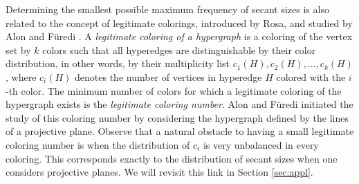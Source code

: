 \documentclass[10pt]{article}
\theoremstyle{definition}
\newcommand{\zs}[1]{\textcolor{magenta}{\textbf{#1}}}
\begin{document}
	Determining the smallest possible maximum frequency of secant sizes  is also related to the concept of legitimate colorings, introduced by Rosa, and studied by  Alon and Füredi \cite{Alon-Furedi}. A\textit{ legitimate coloring of a hypergraph} is a coloring of the vertex set by $k$ colors such that all hyperedges are distinguishable by their color distribution, in other words, by their multiplicity list $c_1(H), c_2(H), \ldots, c_k(H)$, where $c_i(H)$ denotes the number of vertices in hyperedge $H$ colored with the $i$-th color. The minimum number of colors for which a legitimate coloring of the hypergraph exists is the \textit{legitimate coloring number}. Alon and Füredi initiated the study of this coloring number by considering the hypergraph defined by the lines of a projective plane.  {Observe that a natural obstacle to having a small legitimate coloring number is when the distribution of $c_i$ is very unbalanced in every coloring. This corresponds exactly to the distribution of secant sizes when one considers  projective planes. We will revisit this link in Section \ref{sec:appl}.}%
	
\end{document}
